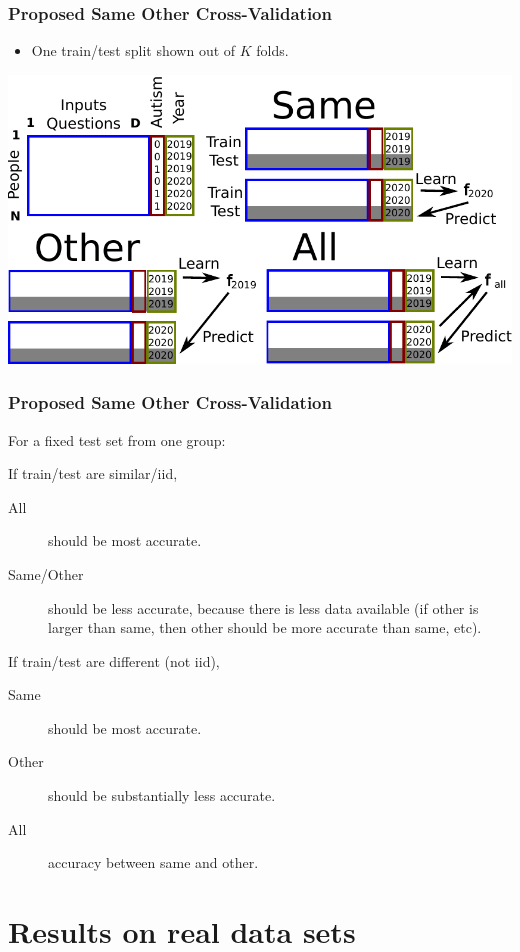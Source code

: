 \documentclass{beamer}
\begin{document}
\begin{frame}
  \frametitle{Proposed Same Other Cross-Validation}
  \begin{itemize}
  \item One train/test split shown out of $K$ folds.
  \end{itemize}
  \includegraphics[width=\textwidth]{drawing-cv-same-other-years-4.pdf}
\end{frame}

\begin{frame}
  \frametitle{Proposed Same Other Cross-Validation}
  For a fixed test set from one group:
  
  If train/test are similar/iid,
  \begin{description}
  \item[All] should be most accurate.
  \item[Same/Other] should be less accurate, because there is less
    data available (if other is larger than same, then other should be
    more accurate than same, etc).
  \end{description}

  If train/test are different (not iid),
  \begin{description}
  \item[Same] should be most accurate.
  \item[Other] should be substantially less accurate.
  \item[All] accuracy between same and other.
  \end{description}
\end{frame}

\section{Results on real data sets}
\end{document}
